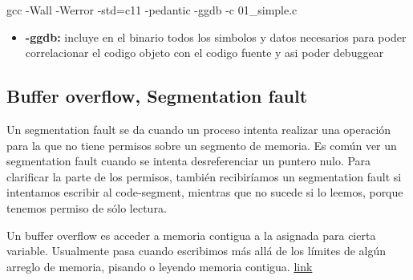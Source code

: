 \documentclass[../main.tex]{subfiles}
\begin{document}
        gcc -Wall -Werror -std=c11 -pedantic -ggdb -c 01\_simple.c
        \begin{itemize}
            \item \textbf{-ggdb:} incluye en el binario todos los simbolos y datos necesarios para poder correlacionar el codigo objeto con el codigo fuente y asi poder debuggear
        \end{itemize}

    \subsection{Buffer overflow, Segmentation fault}
        Un segmentation fault se da cuando un proceso intenta realizar una operación para la que no tiene permisos sobre un segmento de memoria. Es común ver un segmentation fault cuando se intenta desreferenciar un puntero nulo. Para clarificar la parte de los permisos, también recibiríamos un segmentation fault si intentamos escribir al code-segment, mientras que no sucede si lo leemos, porque tenemos permiso de sólo lectura.

        Un buffer overflow es acceder a memoria contigua a la asignada para cierta variable. Usualmente pasa cuando escribimos más allá de los límites de algún arreglo de memoria, pisando o leyendo memoria contigua. \href{https://taller-de-programacion.github.io/blog/2021/04/26/SIGSEGV-BufOverflow.html}{link}
\end{document}

